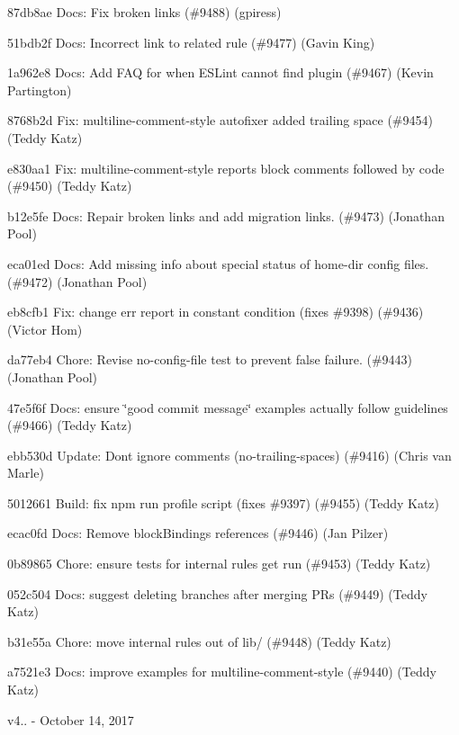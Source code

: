 \begin{DoxyItemize}
\item 87db8ae Docs\+: Fix broken links (\#9488) (gpiress)
\item 51bdb2f Docs\+: Incorrect link to related rule (\#9477) (Gavin King)
\item 1a962e8 Docs\+: Add F\+AQ for when E\+S\+Lint cannot find plugin (\#9467) (Kevin Partington)
\item 8768b2d Fix\+: multiline-\/comment-\/style autofixer added trailing space (\#9454) (Teddy Katz)
\item e830aa1 Fix\+: multiline-\/comment-\/style reports block comments followed by code (\#9450) (Teddy Katz)
\item b12e5fe Docs\+: Repair broken links and add migration links. (\#9473) (Jonathan Pool)
\item eca01ed Docs\+: Add missing info about special status of home-\/dir config files. (\#9472) (Jonathan Pool)
\item eb8cfb1 Fix\+: change err report in constant condition (fixes \#9398) (\#9436) (Victor Hom)
\item da77eb4 Chore\+: Revise no-\/config-\/file test to prevent false failure. (\#9443) (Jonathan Pool)
\item 47e5f6f Docs\+: ensure \char`\"{}good commit message\char`\"{} examples actually follow guidelines (\#9466) (Teddy Katz)
\item ebb530d Update\+: Don\textquotesingle{}t ignore comments (no-\/trailing-\/spaces) (\#9416) (Chris van Marle)
\item 5012661 Build\+: fix {\ttfamily npm run profile} script (fixes \#9397) (\#9455) (Teddy Katz)
\item ecac0fd Docs\+: Remove block\+Bindings references (\#9446) (Jan Pilzer)
\item 0b89865 Chore\+: ensure tests for internal rules get run (\#9453) (Teddy Katz)
\item 052c504 Docs\+: suggest deleting branches after merging P\+Rs (\#9449) (Teddy Katz)
\item b31e55a Chore\+: move internal rules out of lib/ (\#9448) (Teddy Katz)
\item a7521e3 Docs\+: improve examples for multiline-\/comment-\/style (\#9440) (Teddy Katz)
\end{DoxyItemize}

v4.. -\/ October 14, 2017


